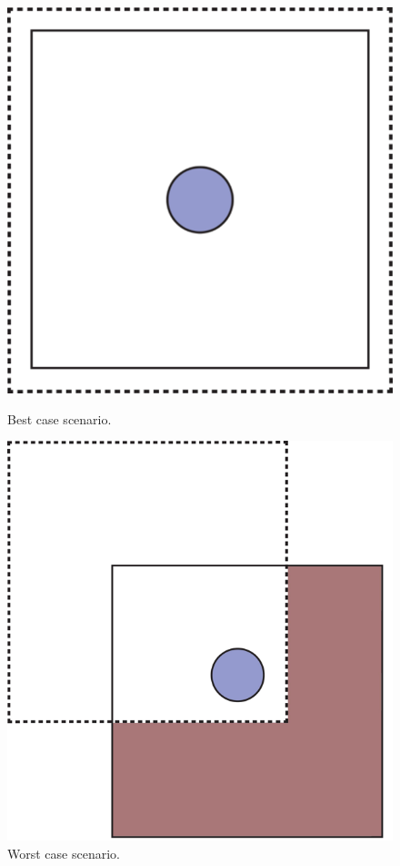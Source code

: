 \documentclass{report}
\begin{document}
				\begin{figure}[!h]
					\centering
					\begin{minipage}[b!]{0.35\textwidth}
						\includegraphics[width=\textwidth]{img/area_most.png}
						\caption{Best case scenario.}
						\label{fig:area_most}
					\end{minipage}
					\hfill
					\begin{minipage}[b!]{0.4\textwidth}
						\includegraphics[width=\textwidth]{img/area_least.png}
						\caption{Worst case scenario.}
						\label{fig:area_least}
					\end{minipage}
				\end{figure} 
			
\end{document}
